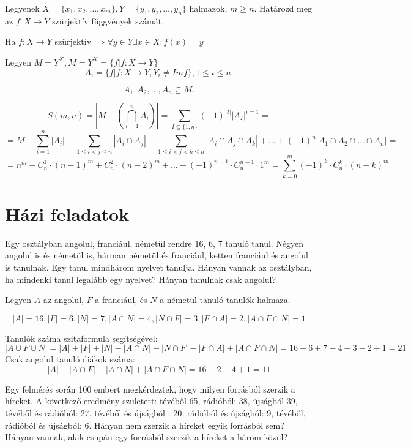\begin{problem}
Legyenek $X=\{x_{1},x_{2},\ldots,x_{m}\},Y=\{y_{1},y_{2},\ldots,y_{n}\}$
halmazok, $m\geq n.$ Határozd meg az $f:X\rightarrow Y$ szürjektív
függvények számát.
\end{problem}
\begin{solution}
Ha $f:X\rightarrow Y$ szürjektív $\Rightarrow\forall y\in Y\exists x\in X:f(x)=y$

Legyen $M=Y^{X},M=Y^{X}=\{f|f:X\rightarrow Y\}$\\

\[
A_{i}=\{f|f:X\rightarrow Y,Y_{i}\neq Imf\},1\leq i\leq n.
\]

\[
A_{1},A_{2},\ldots,A_{n}\subseteq M.
\]

\[
S(m,n)=|M-(\bigcap_{i=1}^{n}A_{i})|=\sum_{I\subseteq\{1,n\}}(-1)^{|I|}|A_{I}|^{i=1}=
\]
\[
=M-\sum_{i=1}^{n}|A_{i}|+\sum_{1\leq i<j\leq n}|A_{i}\cap A_{j}|-\sum_{1\leq i<j<k\leq n}|A_{i}\cap A_{j}\cap A_{k}|+\ldots+(-1)^{n}|A_{1}\cap A_{2}\cap\ldots\cap A_{n}|=
\]
\[
=n^{m}-C_{n}^{1}\cdot(n-1)^{m}+C_{n}^{2}\cdot(n-2)^{m}+\ldots+(-1)^{n-1}\cdot C_{n}^{n-1}\cdot1^{m}=\sum_{k=0}^{m}(-1)^{k}\cdot C_{n}^{k}\cdot(n-k)^{m}
\]
\end{solution}

\section*{Házi feladatok}
\begin{problem}
Egy osztályban angolul, franciául, németül rendre 16, 6, 7 tanuló
tanul. Négyen angolul is és németül is, hárman németül és franciául,
ketten franciául és angolul is tanulnak. Egy tanul mindhárom nyelvet
tanulja. Hányan vannak az osztályban, ha mindenki tanul legalább egy
nyelvet? Hányan tanulnak csak angolul?\\
 
\end{problem}

\begin{solution}
Legyen $A$ az angolul, $F$ a franciául, és $N$ a németül tanuló
tanulók halmaza.

\[
|A|=16,|F|=6,|N|=7,|A\cap N|=4,|N\cap F|=3,|F\cap A|=2,|A\cap F\cap N|=1
\]

Tanulók száma szitaformula segítségével: 
\[
|A\cup F\cup N|=|A|+|F|+|N|-|A\cap N|-|N\cap F|-|F\cap A|+|A\cap F\cap N|=16+6+7-4-3-2+1=21
\]
Csak angolul tanuló diákok száma: 
\[
|A|-|A\cap F|-|A\cap N|+|A\cap F\cap N|=16-2-4+1=11
\]
\end{solution}
\begin{problem}
Egy felmérés során 100 embert megkérdeztek, hogy milyen forrásból
szerzik a híreket. A következő eredmény született: tévéből 65, rádióból:
38, újságból 39, tévéből és rádióból: 27, tévéből és újságból : 20,
rádióból és újságból: 9, tévéből, rádióból és újságból: 6. Hányan
nem szerzik a híreket egyik forrásból sem? Hányan vannak, akik csupán
egy forrásból szerzik a híreket a három közül?\\
 
\end{problem}

